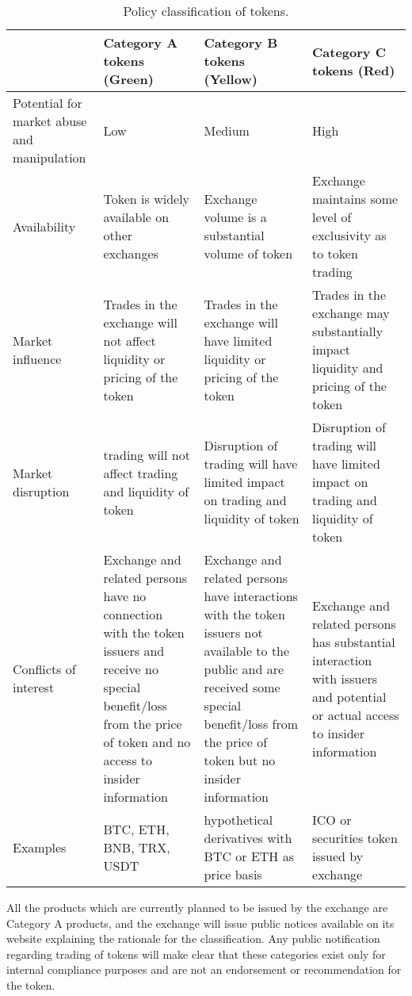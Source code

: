 \begin{table}[htbp]
\centering
\begin{tabularx}{\textwidth}{|X|X|X|X|}
\hline
& \textbf{Category A tokens (Green)} & \textbf{Category B tokens (Yellow)} &
\textbf{Category C tokens (Red)} \\
\hline
Potential for market abuse and manipulation & Low & Medium & High \\
Availability & Token is widely available on other exchanges & Exchange
volume is a substantial volume of token & Exchange maintains some
level of exclusivity as to token trading \\
\hline
Market influence & Trades in the exchange will not affect
liquidity or pricing of the token & Trades in the exchange will
have limited liquidity or pricing of the token & Trades in the
exchange may substantially impact liquidity and pricing of the token \\
\hline
Market disruption & trading will not affect trading and
liquidity of token & Disruption of trading will have limited impact on
trading and liquidity of token & Disruption of trading will have
limited impact on trading and liquidity of token  \\
\hline
Conflicts of interest & Exchange and related persons have no connection
with the token issuers and receive no special benefit/loss from the price of
token and no access to insider information & Exchange and related persons have interactions with the token
issuers not available to the public and are received some special
benefit/loss from the price of token but no insider information & Exchange and related persons has
substantial interaction with issuers and potential or actual access to
insider information\\
\hline
Examples & BTC, ETH, BNB, TRX, USDT & hypothetical derivatives with BTC
or ETH as price basis & ICO or securities token issued by exchange \\
\hline
\end{tabularx}
\caption{Policy classification of tokens.}
\end{table}

All the products which are currently planned to be issued by
the exchange are Category A products, and the exchange will issue
public notices available on its website explaining the rationale for
the classification.  Any public notification regarding trading of
tokens will make clear that these categories exist only for internal
compliance purposes and are not an endorsement or recommendation for
the token.


